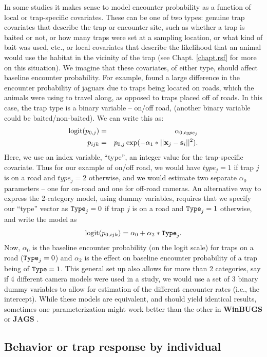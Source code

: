 In some studies it makes sense to model encounter probability as a
function of local or trap-specific covariates. These can be one of two
types: genuine trap covariates that describe the trap or encounter site,
such as whether a trap is baited or not, or how many traps were set at a sampling location,
or what kind of bait was used, etc., or local covariates that
describe the likelihood that an animal would use the habitat in the
vicinity of the trap (see Chapt. \ref{chapt.rsf} for more on this situation).
We imagine that these covariates, of either type, should affect
baseline encounter probability.
For example, \citet{sollmann_etal:2011}
found a large difference in the encounter probability of jaguars due to traps
being located on roads, which the animals were using to travel along, as
opposed to traps placed off of roads.  In this case, the trap
type is a binary variable -- on/off road,
(another binary variable could be baited/non-baited).  We can write
this 
as:
\begin{eqnarray*}
\mbox{logit}(p_{0,j}) &= &\alpha_{0,type_j}  \\
p_{ijk}  & = & p_{0,j} \exp(- \alpha_1*||{\bf x}_{j}-{\bf s}_{i}||^2).
\end{eqnarray*}
Here, we use an index variable, ``type'', an integer 
value for the trap-specific covariate. 
Thus for our example of on/off
road, we would have $type_j = 1$ if trap $j$ is on a road and $type_j =
2$ otherwise, and we would estimate two separate $\alpha_{0}$
parameters -- one for
on-road and one for off-road cameras.  
An alternative way to express the 2-category model, using dummy variables, 
requires that we
specify our ``type'' vector as $\mbox{\tt Type}_j = 0$ if trap $j$ is on a road and
$\mbox{\tt Type}_j = 1$ otherwise, and write the model as
\[
\mbox{logit}(p_{0,ijk}) = \alpha_{0} + \alpha_{2} * \mbox{\tt Type}_{j}.
\]
Now, $\alpha_{0}$ is the baseline encounter probability (on the logit
scale) for traps on a road ($\mbox{\tt Type}_j = 0$) and $\alpha_{2}$
is the effect on baseline encounter probability of a trap being of
$\mbox{\tt Type} = 1$.  This general set up also allows for more than
2 categories, say if 4 different camera models were used in a study,
we would use a set of 3 binary dummy variables to allow for estimation
of the different encounter rates (i.e., the intercept).  While these
models are equivalent, and should yield identical results, sometimes
one parameterization might work better than the other in {\bf WinBUGS}
or {\bf JAGS} \citep{kery:2010}.

\subsection{Behavior or trap response by individual}
\label{covariates.sec.behavior}


